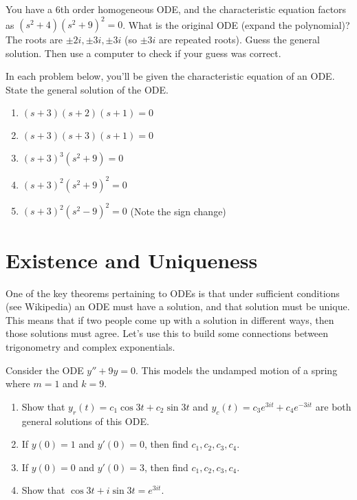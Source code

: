 \begin{problem}
 You have a 6th order homogeneous ODE, and the characteristic equation factors as $(s^2+4)(s^2+9)^2=0$. What is the original ODE (expand the polynomial)? The roots are $\pm 2i, \pm 3i, \pm 3i$ (so $\pm 3i$ are repeated roots). Guess the general solution.  Then use a computer to check if your guess was correct.
\end{problem}

\begin{problem}
 In each problem below, you'll be given the characteristic equation of an ODE. State the general solution of the ODE.
\begin{enumerate}
 \item $(s+3)(s+2)(s+1)=0$
 \item $(s+3)(s+3)(s+1)=0$
 \item $(s+3)^3(s^2+9)=0$
 \item $(s+3)^2(s^2+9)^2=0$
 \item $(s+3)^2(s^2-9)^2=0$ (Note the sign change)
\end{enumerate}
\end{problem}


\section{Existence and Uniqueness}

One of the key theorems pertaining to ODEs is that under sufficient conditions (see Wikipedia) an ODE must have a solution, and that solution must be unique.  This means that if two people come up with a solution in different ways, then those solutions must agree.  Let's use this to build some connections between trigonometry and complex exponentials.

\begin{problem}
 Consider the ODE $y''+9y=0$. This models the undamped motion of a spring where $m=1$ and $k=9$.    
\begin{enumerate}
 \item Show that $y_r(t) = c_1\cos 3t+c_2\sin 3t$ and $y_c(t) = c_3e^{3it}+c_4e^{-3it}$ are both general solutions of this ODE.
 \item If $y(0)=1$ and $y'(0)=0$, then find $c_1,c_2,c_3,c_4$.
 \item If $y(0)=0$ and $y'(0)=3$, then find $c_1,c_2,c_3,c_4$.
 \item Show that $ \cos 3t+i\sin 3t=e^{3it}$. 

\end{enumerate}

\end{problem}
